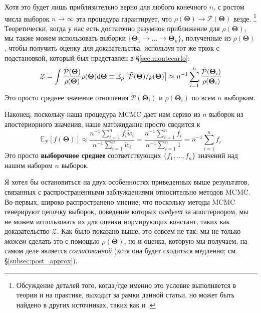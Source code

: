 \documentclass[12pt, titlepage]{article}
\newcommand{\deriv}{\ensuremath{{\rm d}}}  %
\newcommand{\meanwrt}[2]{\ensuremath{\mathbb{E}_{{#2}}\left[{#1}\right]}}
\newcommand{\params}{\ensuremath{\boldsymbol\Theta}}
\newcommand{\posterior}{\ensuremath{\mathcal{P}}}
\newcommand{\evidence}{\ensuremath{\mathcal{Z}}}
\begin{document}
Хотя это будет лишь приблизительно верно для любого конечного $n$, с ростом числа выборок $n \rightarrow \infty$ эта процедура гарантирует, что $\rho(\params)\rightarrow \posterior(\params)$ везде. \footnote{Обсуждение деталей того, когда/где именно это условие выполняется в теории и на практике, выходит за рамки данной статьи, но может быть найдено в других источниках, таких как \citet{asmussenglynn11} и \citet{brooks+11}.} Теоретически, когда у нас есть достаточно разумное приближение для $\rho(\params)$, мы также можем использовать выборки $\{ \params_1 \rightarrow \dots \rightarrow \params_n \}$, полученные из $\rho(\params)$, чтобы получить оценку для доказательства, используя тот же трюк с подстановкой, который был представлен в \S\ref{sec:montecarlo}:
\begin{align}
    \evidence
    = \int \frac{\tilde{\posterior}(\params)}{\rho(\params)}
    \rho(\params) \deriv \params
    \equiv \meanwrt{\tilde{\posterior}(\params)/\rho(\params)}{\rho}
    \approx n^{-1} \sum_{i=1}^{n} 
    \frac{\tilde{\posterior}(\params_i)}{\rho(\params_i)}
\end{align}
Это просто среднее значение отношения $\tilde{\posterior}(\params_i)$ и $\rho(\params_i)$
по всем $n$ выборкам.

Наконец, поскольку наша процедура MCMC дает нам серию из $n$ выборок из апостериорного значения, наше матожидание просто сводится к
\begin{equation}
    \meanwrt{f(\params)}{\posterior} 
    \approx \frac{n^{-1} \sum_{i=1}^{n} f_i \tilde{w}_i}
    {n^{-1} \sum_{i=1}^{n} \tilde{w}_i}
    = \frac{n^{-1} \sum_{i=1}^{n} f_i}
    {n^{-1} \sum_{i=1}^{n} 1}
    = n^{-1} \sum_{i=1}^{n} f_i
\end{equation}
Это просто \textbf{выборочное среднее} соответствующих $\{ f_1, \dots, f_n \}$ значений над нашим набором $n$ выборок. 

Я хотел бы остановиться на двух особенностях приведенных выше результатов, связанных с распространенными заблуждениями относительно методов MCMC. Во-первых, широко распространено мнение, что поскольку методы MCMC генерируют цепочку выборок, поведение которых \textit{следует} за апостериором, мы не можем использовать их для оценки нормирующих констант, таких как доказательство $\evidence$. Как было показано выше, это совсем не так: мы не только \textit{можем} сделать это с помощью $\rho(\params)$, но и оценка, которую мы получаем, на самом деле является \textit{согласованной} (хотя она будет сходиться медленно; см. \S\ref{subsec:post_approx}).
\end{document}
